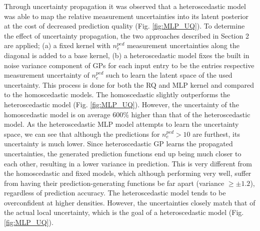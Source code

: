 \documentclass[a4paper, twoside, final, 12pt]{article}
\begin{document}
{Through uncertainty propagation it was observed that a heteroscedastic model was able to map the relative measurement uncertainties into its latent posterior at the cost of decreased prediction quality (Fig.  \ref{fig:MLP_UQ}). 
To determine the effect of uncertainty propagation, the two approaches described in Section 2 are applied; (a) a fixed kernel with $n_e^{ped}$ measurement uncertainties along the diagonal is added to a base kernel, (b) a heteroscedastic model fixes the built in noise variance component of GPs for each input entry to be the entries respective measurement uncertainty of $n_e^{ped}$ such to learn the latent space of the used uncertainty. This process is done for both the RQ and MLP kernel and compared to the homoscedastic models.
The homoscedastic slightly outperforms the heteroscedastic model (Fig. \ref{fig:MLP_UQ}). However, the uncertainty of the homoscedastic model is on average 600\% higher than that of the heteroscedastic model. As the heteroscedastic MLP model attempts to learn the uncertainty space, we can see that although the predictions for $n_e^{ped} > 10$ are furthest, its uncertainty is much lower. Since heteroscedastic GP learns the propagated uncertainties, the generated prediction functions end up being much closer to each other, resulting in a lower variance in prediction. This is very different from the homoscedastic and fixed models, which although performing very well, suffer from having their prediction-generating functions be far apart (variance $ \geq \pm 1.2$), regardless of prediction accuracy. The heteroscedastic model tends to be overconfident at higher densities. However, the uncertainties closely match that of the actual local uncertainty, which is the goal of a heteroscedastic model (Fig. \ref{fig:MLP_UQ}).

}
\end{document}
